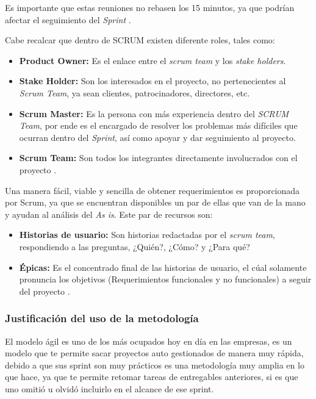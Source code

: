 \documentclass[10pt]{article}
\begin{document}
\setlength{\parskip}{2mm}

Es importante que estas reuniones no rebasen los 15 minutos, ya que podrían afectar el seguimiento del \textit{Sprint} \cite{IEEEreferencias:Ref24}.

\setlength{\parskip}{2mm}

Cabe recalcar que dentro de SCRUM existen diferente roles, tales como:
\begin{itemize}
    \item \textbf{Product Owner:} Es el enlace entre el \textit{scrum team} y los \textit{stake holders}.
    \item \textbf{Stake Holder:} Son los interesados en el proyecto, no pertenecientes al \textit{Scrum Team}, ya sean clientes, patrocinadores, directores, etc.
    \item \textbf{Scrum Master:} Es la persona con más experiencia dentro del \textit{SCRUM Team}, por ende es el encargado de resolver los problemas más difíciles que ocurran dentro del \textit{Sprint}, así como apoyar y dar seguimiento al proyecto.
    \item \textbf{Scrum Team:} Son todos los integrantes directamente involucrados con el proyecto \cite{IEEEreferencias:Ref24}.
\end{itemize}

Una manera fácil, viable y sencilla de obtener requerimientos es proporcionada por Scrum, ya que se encuentran disponibles un par de ellas que van de la mano y ayudan al análisis del \textit{As is}. Este par de recursos son: 

\begin{itemize}
    \item \textbf{Historias de usuario:} Son historias redactadas por el \textit{scrum team}, respondiendo a las preguntas, ¿Quién?, ¿Cómo? y ¿Para qué?
    \item \textbf{Épicas:} Es el concentrado final de las historias de usuario, el cúal solamente pronuncia los objetivos (Requerimientos funcionales y no funcionales) a seguir del proyecto \cite{IEEEreferencias:Ref24}.
\end{itemize}
\newpage
\subsubsection{Justificación del uso de la metodología}

El modelo ágil es uno de los más ocupados hoy en día en las empresas, es un modelo que te permite sacar proyectos auto gestionados de manera muy rápida, debido a que sus sprint son muy prácticos es una metodología muy amplia en lo que hace, ya que te permite retomar tareas de entregables anteriores, si es que uno omitió u olvidó incluirlo en el alcance de ese sprint.
\end{document}
